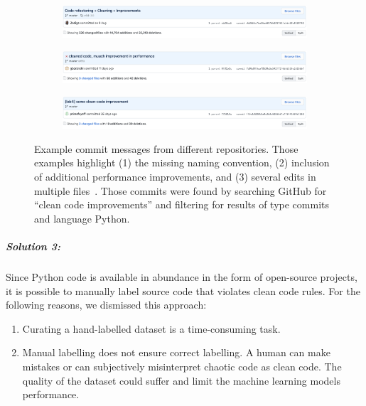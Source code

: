 \begin{figure}
    \begin{subfigure}{\textwidth}
        \includegraphics[width=1\linewidth]{img/ML/commit_messages/screen_1.png}
    \end{subfigure}
    \begin{subfigure}{\textwidth}
        \includegraphics[width=1\linewidth]{img/ML/commit_messages/screen_2.png}
    \end{subfigure}
    \begin{subfigure}{\textwidth}
        \includegraphics[width=1\linewidth]{img/ML/commit_messages/screen_3.png}
    \end{subfigure}
    \caption[Example commit messages that underline the inconsistency in commit message naming.]
    {Example commit messages from different repositories. Those examples highlight (1) the missing naming convention, (2) inclusion of additional performance improvements, and (3) several edits in multiple files~\cite{pendenque_code_2020, baranski_cleaned_2020, timofeev_lab4_2020}. Those commits were found by searching GitHub for \enquote{clean code improvements} and filtering for results of type commits and language Python. }
    \label{fig:commit_messages}
\end{figure}


\subparagraph{Solution 3:}
Since Python code is available in abundance in the form of open-source projects, it is possible to manually label source code that violates clean code rules. 
For the following reasons, we dismissed this approach:
\begin{enumerate}
    \item Curating a hand-labelled dataset is a time-consuming task. 
    \item Manual labelling does not ensure correct labelling. A human can make mistakes or can subjectively misinterpret chaotic code as clean code. The quality of the dataset could suffer and limit the machine learning models performance.
\end{enumerate}

